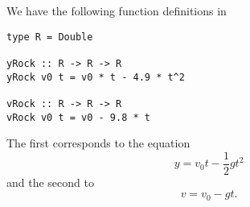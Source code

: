 
We have the following function definitions in 
\begin{verbatim}
type R = Double

yRock :: R -> R -> R
yRock v0 t = v0 * t - 4.9 * t^2

vRock :: R -> R -> R
vRock v0 t = v0 - 9.8 * t
\end{verbatim}
The first corresponds to the equation
\[
    y = v_0 t - \frac{1}{2}g t^2
\]
and the second to
\[
    v = v_0 - gt.
\]

